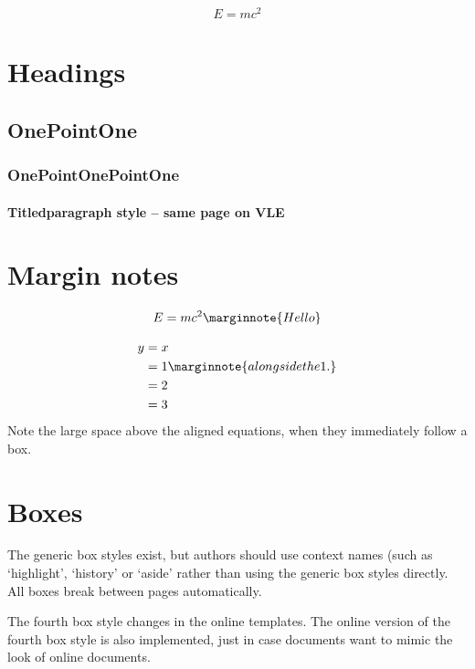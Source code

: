 \documentclass[solutionsatend]{ouunit}
\author{Robert Hasson}
\newenvironment{highlight}[1][]{\begin{style2box}[#1]}{\end{style2box}}
\begin{document}
\makefrontpages
\introduction
\lipsum[133]
\[
E=mc^2
\]
\lipsum[133]
\section{Headings}
\lipsum[133]
\subsection{OnePointOne}
\lipsum[133]
\subsubsection{OnePointOnePointOne}
\lipsum[133]
\paragraph{Titledparagraph style -- same page on VLE}
\lipsum[133]
\section{Margin notes}
\begin{highlight}
\lipsum[133]

\lipsum[133]
\[
E=mc^2\marginnote{Hello}
\]
\end{highlight}
\lipsum[133]
\begin{highlight}
\lipsum[133]
\end{highlight}
\begin{align*}
y &=x\\
&=1\marginnote{alongside the 1.}\\
&=2\\
&=3
\end{align*}
Note the large space above the aligned equations, when they immediately follow a box.
\begin{highlight}[Title]
\lipsum[133]
\end{highlight}
\section{Boxes}
The generic box styles exist, but authors should use context names (such as `highlight', `history' or `aside' rather than using the generic box styles directly. All boxes break between pages automatically.
\begin{style1box}
\lipsum[1]
\end{style1box}
\begin{style2box}
\lipsum[2]
\end{style2box}
\begin{style3box}
\lipsum[3]
\end{style3box}
\begin{style4box}
\lipsum[4]
\end{style4box}
The fourth box style changes in the online templates. The online version of the fourth box style is also implemented, just in case documents want to mimic the look of online documents.
\begin{onlinestyle4box}
\lipsum[4]
\end{onlinestyle4box}
\end{document}
